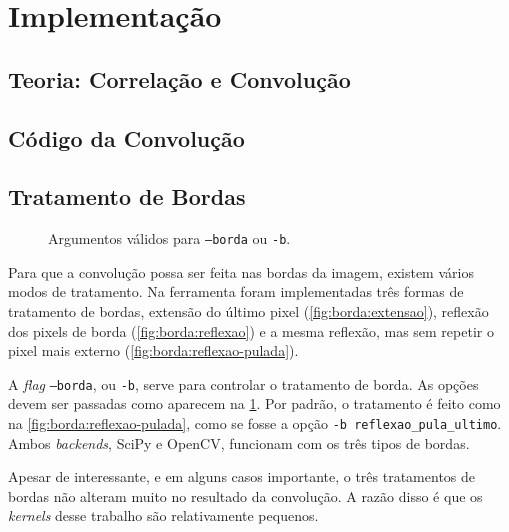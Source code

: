 \section{Implementação} \label{sec:impl}

\subsection{Teoria: Correlação e Convolução}

    

\subsection{Código da Convolução}

    

\subsection{Tratamento de Bordas}

    \begin{figure}[H]
        \centering
        

        \caption{Argumentos válidos para \texttt{--borda} ou \texttt{-b}.}
        \label{fig:borda}
    \end{figure}

    Para que a convolução possa ser feita nas bordas da imagem, existem vários modos de tratamento. Na ferramenta foram implementadas três formas de tratamento de bordas, extensão do último pixel (\ref{fig:borda:extensao}), reflexão dos pixels de borda (\ref{fig:borda:reflexao}) e a mesma reflexão, mas sem repetir o pixel mais externo (\ref{fig:borda:reflexao-pulada}).

    A \textit{flag} \texttt{--borda}, ou \texttt{-b}, serve para controlar o tratamento de borda. As opções devem ser passadas como aparecem na \cref{fig:borda}. Por padrão, o tratamento é feito como na \cref{fig:borda:reflexao-pulada}, como se fosse a opção \texttt{-b reflexao_pula_ultimo}. Ambos \textit{backends}, SciPy e OpenCV, funcionam com os três tipos de bordas.

    Apesar de interessante, e em alguns casos importante, o três tratamentos de bordas não alteram muito no resultado da convolução. A razão disso é que os \textit{kernels} desse trabalho são relativamente pequenos.
